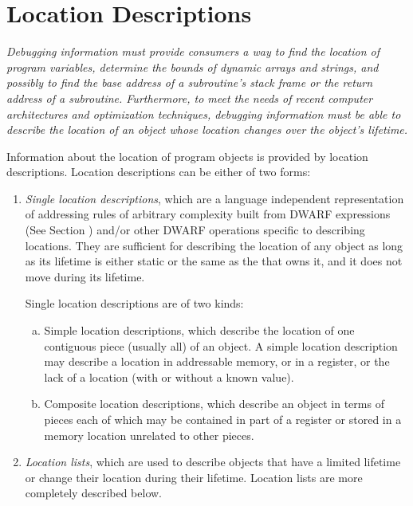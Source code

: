 \section{Location Descriptions}
\label{chap:locationdescriptions}
\textit{Debugging information 
must 
provide consumers a way to find
the location of program variables, determine the bounds
of dynamic arrays and strings, and possibly to find the
base address of a subroutine\textquoteright s stack frame or the return
address of a subroutine. Furthermore, to meet the needs of
recent computer architectures and optimization techniques,
debugging information must be able to describe the location of
an object whose location changes over the object\textquoteright s lifetime.}

Information about the location of program objects is provided
by location descriptions. Location descriptions can be either
of two forms:
\begin{enumerate}[1. ]
\item \textit{Single location descriptions}, 
which 
are 
a language independent representation of
addressing rules of arbitrary complexity built from 
DWARF expressions (See Section ) 
and/or other
DWARF operations specific to describing locations. They are
sufficient for describing the location of any object as long
as its lifetime is either static or the same as the 
 that owns it, 
and it does not move during its lifetime.

Single location descriptions are of two kinds:
\begin{enumerate}[a) ]
\item Simple location descriptions, which describe the location
of one contiguous piece (usually all) of an object. A simple
location description may describe a location in addressable
memory, or in a register, or the lack of a location (with or
without a known value).

\item  Composite location descriptions, which describe an
object in terms of pieces each of which may be contained in
part of a register or stored in a memory location unrelated
to other pieces.

\end{enumerate}
\item \textit{Location lists}, which are used to 
describe
objects that have a limited lifetime or change their location
during their lifetime. Location lists are more completely
described below.

\end{enumerate}

